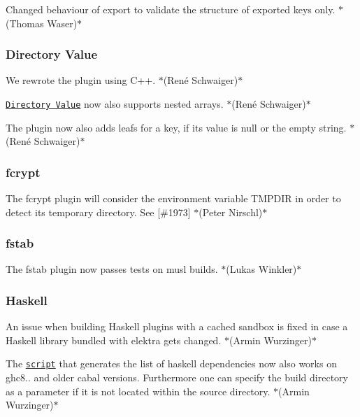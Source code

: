 \begin{DoxyItemize}
\item Changed behaviour of export to validate the structure of exported keys only. $\ast$(Thomas Waser)$\ast$
\end{DoxyItemize}

\subsubsection*{Directory Value}


\begin{DoxyItemize}
\item We rewrote the plugin using C++. $\ast$(René Schwaiger)$\ast$
\item \href{https://www.libelektra.org/plugins/directoryvalue}{\tt Directory Value} now also supports nested arrays. $\ast$(René Schwaiger)$\ast$
\item The plugin now also adds leafs for a key, if its value is null or the empty string. $\ast$(René Schwaiger)$\ast$
\end{DoxyItemize}

\subsubsection*{fcrypt}


\begin{DoxyItemize}
\item The {\ttfamily fcrypt} plugin will consider the environment variable {\ttfamily T\+M\+P\+D\+IR} in order to detect its temporary directory. See \mbox{[}\#1973\mbox{]} $\ast$(Peter Nirschl)$\ast$
\end{DoxyItemize}

\subsubsection*{fstab}


\begin{DoxyItemize}
\item The {\ttfamily fstab} plugin now passes tests on musl builds. $\ast$(Lukas Winkler)$\ast$
\end{DoxyItemize}

\subsubsection*{Haskell}


\begin{DoxyItemize}
\item An issue when building Haskell plugins with a cached sandbox is fixed in case a Haskell library bundled with elektra gets changed. $\ast$(Armin Wurzinger)$\ast$
\item The \href{https://master.libelektra.org/scripts/generate-haskell-dependencies}{\tt script} that generates the list of haskell dependencies now also works on ghc8.. and older cabal versions. Furthermore one can specify the build directory as a parameter if it is not located within the source directory. $\ast$(Armin Wurzinger)$\ast$
\end{DoxyItemize}

